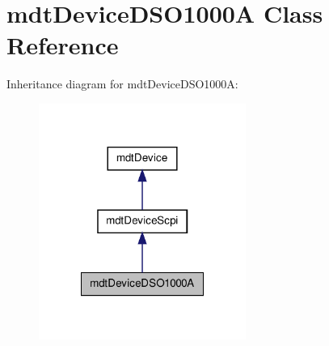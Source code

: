 \hypertarget{classmdt_device_d_s_o1000_a}{
\section{mdtDeviceDSO1000A Class Reference}
\label{classmdt_device_d_s_o1000_a}
}


Inheritance diagram for mdtDeviceDSO1000A:\nopagebreak
\begin{figure}[H]
\begin{center}
\leavevmode
\includegraphics[width=192pt]{classmdt_device_d_s_o1000_a__inherit__graph}
\end{center}
\end{figure}



